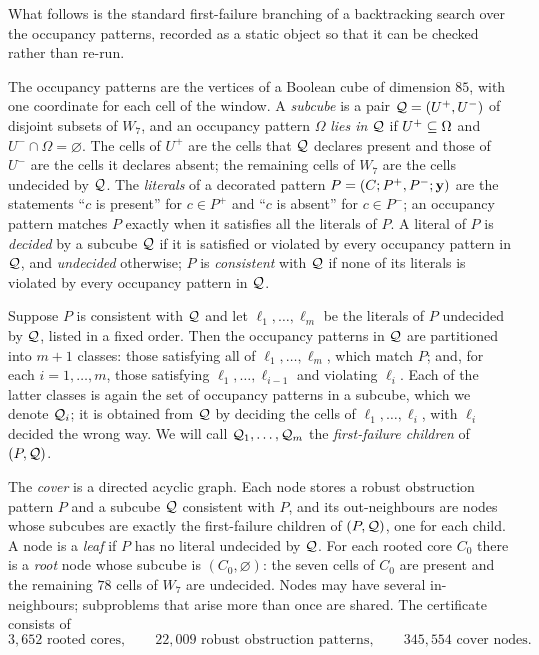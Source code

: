 \documentclass[11pt]{article}
\theoremstyle{definition}
\begin{document}
What follows is the standard first-failure branching of a backtracking search
over the occupancy patterns, recorded as a static object so that it can be
checked rather than re-run.

The occupancy patterns are the vertices of a Boolean cube of dimension $85$,
with one coordinate for each cell of the window.
A \textsl{subcube} is a pair ${\mathcal Q}=(U^{+},U^{-})$ of disjoint subsets of $W_7$,
and an occupancy pattern $\Omega$ \textsl{lies in} ${\mathcal Q}$ if $U^{+}\subseteq \Omega$ and
$U^{-}\cap \Omega=\varnothing$.  The cells of $U^{+}$ are the cells that ${\mathcal Q}$
declares present and those of $U^{-}$ are the cells it declares absent; the
remaining cells of $W_7$ are the cells undecided by ${\mathcal Q}$.
The \textsl{literals} of a decorated pattern
$P=(C;P^{+},P^{-};{\mathbf y})$ are the statements ``$c$ is present'' for $c\in P^{+}$
and ``$c$ is absent'' for $c\in P^{-}$; an occupancy pattern matches $P$
exactly when it satisfies all the literals of $P$.  A literal of $P$ is
\textsl{decided} by a subcube ${\mathcal Q}$ if it is satisfied or violated by every
occupancy pattern in ${\mathcal Q}$, and \textsl{undecided} otherwise; $P$ is
\textsl{consistent} with ${\mathcal Q}$ if none of its literals is violated by every
occupancy pattern in ${\mathcal Q}$.

Suppose $P$ is consistent with ${\mathcal Q}$ and let $\ell_1,\ldots,\ell_m$ be the
literals of $P$ undecided by ${\mathcal Q}$, listed in a fixed order.  Then the
occupancy patterns in ${\mathcal Q}$ are partitioned into $m+1$ classes: those
satisfying all of $\ell_1,\ldots,\ell_m$, which match $P$; and, for each
$i=1,\ldots,m$, those satisfying $\ell_1,\ldots,\ell_{i-1}$ and violating
$\ell_i$.  Each of the latter classes is again the set of occupancy patterns
in a subcube, which we denote ${\mathcal Q}_i$; it is obtained from ${\mathcal Q}$ by deciding the
cells of $\ell_1,\ldots,\ell_i$, with $\ell_i$ decided the wrong way.  We
will call ${\mathcal Q}_1,\ldots,{\mathcal Q}_m$ the \textsl{first-failure children} of
$(P,{\mathcal Q})$.

The \textsl{cover} is a directed acyclic graph.  Each node stores a robust
obstruction pattern $P$ and a subcube ${\mathcal Q}$ consistent with $P$, and its
out-neighbours are nodes whose subcubes are exactly the first-failure children
of $(P,{\mathcal Q})$, one for each child.  A node is a \textsl{leaf} if $P$ has no
literal undecided by ${\mathcal Q}$.  For each rooted core $C_0$ there is a
\textsl{root} node whose subcube is $(C_0,\varnothing)$: the seven cells of
$C_0$ are present and the remaining $78$ cells of $W_7$ are undecided.
Nodes may have several in-neighbours; subproblems that arise more than once
are shared.  The certificate consists of
\begin{equation}\label{eq:certificate-counts}
 3{,}652\text{ rooted cores},\qquad
 22{,}009\text{ robust obstruction patterns},\qquad
 345{,}554\text{ cover nodes}.
\end{equation}
\end{document}
